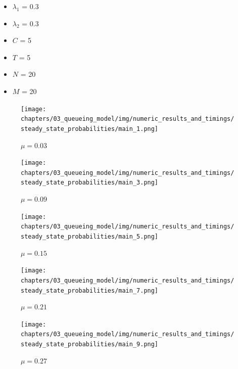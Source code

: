 \begin{multicols}{2}
    \begin{itemize}
        \item \(\lambda_1\) = 0.3
        \item \(\lambda_2\) = 0.3
        \item \(C\) = 5
        \item \(T\) = 5
        \item \(N\) = 20
        \item \(M\) = 20
    \end{itemize}    
\end{multicols}


\begin{figure}[H]
    \texttt{[image: chapters/03\_queueing\_model/img/numeric\_results\_and\_timings/steady\_state\_probabilities/main\_1.png]}
    \caption{\(\mu = 0.03\)}
    \label{fig:comparison_steady_state_probabilities_1}
\end{figure}

\begin{figure}[H]
    \texttt{[image: chapters/03\_queueing\_model/img/numeric\_results\_and\_timings/steady\_state\_probabilities/main\_3.png]}
    \caption{\(\mu = 0.09\)}
    \label{fig:comparison_steady_state_probabilities_2}
\end{figure}

\begin{figure}[H]
    \texttt{[image: chapters/03\_queueing\_model/img/numeric\_results\_and\_timings/steady\_state\_probabilities/main\_5.png]}
    \caption{\(\mu = 0.15\)}
    \label{fig:comparison_steady_state_probabilities_3}
\end{figure}

\begin{figure}[H]
    \texttt{[image: chapters/03\_queueing\_model/img/numeric\_results\_and\_timings/steady\_state\_probabilities/main\_7.png]}
    \caption{\(\mu = 0.21\)}
    \label{fig:comparison_steady_state_probabilities_4}
\end{figure}

\begin{figure}[H]
    \texttt{[image: chapters/03\_queueing\_model/img/numeric\_results\_and\_timings/steady\_state\_probabilities/main\_9.png]}
    \caption{\(\mu = 0.27\)}
    \label{fig:comparison_steady_state_probabilities_5}
\end{figure}

